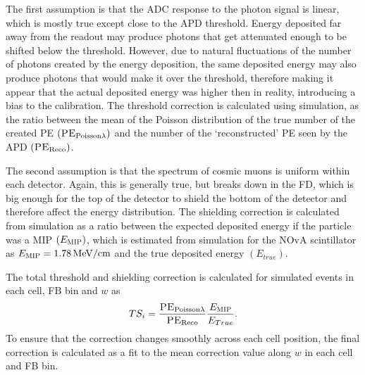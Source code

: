 The first assumption is that the \gls{ADC} response to the photon signal is linear, which is mostly true except close to the \gls{APD} threshold. Energy deposited far away from the readout may produce photons that get attenuated enough to be shifted below the threshold. However, due to natural fluctuations of the number of photons created by the energy deposition, the same deposited energy may also produce photons that would make it over the threshold, therefore making it appear that the actual deposited energy was higher then in reality, introducing a bias to the calibration. The threshold correction is calculated using simulation, as the ratio between the mean of the Poisson distribution of the true number of the created \gls{PE} $\left(\textsc{PE}_{\mathrm{Poisson}\lambda}\right)$ and the number of the `reconstructed' \gls{PE} seen by the \gls{APD} $\left(\textsc{PE}_{\mathrm{Reco}}\right)$.

The second assumption is that the spectrum of cosmic muons is uniform within each detector. Again, this is generally true, but breaks down in the \gls{FD}, which is big enough for the top of the detector to shield the bottom of the detector and therefore affect the energy distribution. The shielding correction is calculated from simulation as a ratio between the expected deposited energy if the particle was a \gls{MIP} $\left(E_{\textsc{MIP}}\right)$, which is estimated from simulation for the \gls{NOvA} scintillator as $E_{\textsc{MIP}}=\unit[1.78]{MeV/cm}$ and the true deposited energy $\left(E_{true}\right)$.

The total threshold and shielding correction is calculated for simulated events in each cell, \gls{FB} bin and $w$ as
\begin{equation}\label{eq:NOvAThresholdShieldingCorrection}
TS_i = \frac{\textsc{PE}_{\mathrm{Poisson}\lambda}}{\textsc{PE}_{\mathrm{Reco}}}\frac{E_{\textsc{MIP}}}{E_{True}}.
\end{equation}
To ensure that the correction changes smoothly across each cell position, the final correction is calculated as a fit to the mean correction value along $w$ in each cell and \gls{FB} bin.


